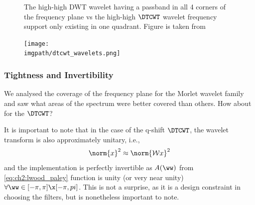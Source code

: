  \begin{figure}
      \newline
              { The high-high DWT wavelet having a passband in
              all 4 corners of the frequency plane vs  the
              high-high $\DTCWT$ wavelet frequency support only existing in one
              quadrant. Figure is taken from \cite{selesnick_dual-tree_2005}}
      \label{fig:ch2:dwt_dtcwt_hh}
  \end{figure}
  \begin{figure}
    \centering
      \texttt{[image: \\imgpath/dtcwt\_wavelets.png]}
      \label{fig:ch2:dtcwt_wavelets}
  \end{figure}

  \subsubsection{Tightness and Invertibility}\label{sec:ch2:dtcwt_tight}
  We analysed the coverage of the frequency plane for the Morlet wavelet family
  and saw what areas of the spectrum were better covered than others. How about
  for the $\DTCWT$?

  It is important to note that in the case of the q-shift $\DTCWT$, the wavelet
  transform is also approximately unitary, i.e.,\
  \begin{equation}
    \norm{x}^2 \approx \norm{\mathcal{W}x}^2
  \end{equation}
  and the implementation is perfectly invertible as $A(\ww)$ from
  \eqref{eq:ch2:lwood_paley}
  function is unity (or very near unity) $\forall \ww \in [-\pi, \pi]\x [-\pi,
  pi]$. This is not a surprise, as it is a design
  constraint in choosing the filters, but is nonetheless important to note.

